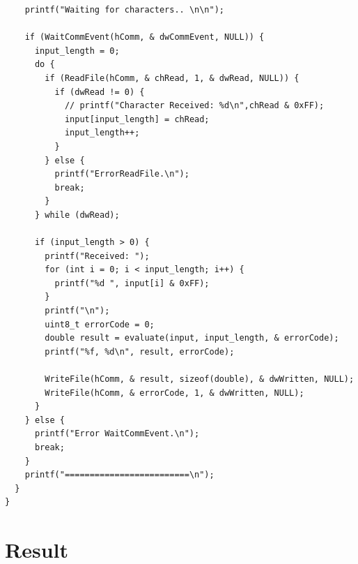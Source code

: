 \documentclass[a4paper, twoside]{report}
\begin{document}
\begin{verbatim}
    printf("Waiting for characters.. \n\n");

    if (WaitCommEvent(hComm, & dwCommEvent, NULL)) {
      input_length = 0;
      do {
        if (ReadFile(hComm, & chRead, 1, & dwRead, NULL)) {
          if (dwRead != 0) {
            // printf("Character Received: %d\n",chRead & 0xFF);
            input[input_length] = chRead;
            input_length++;
          }
        } else {
          printf("ErrorReadFile.\n");
          break;
        }
      } while (dwRead);

      if (input_length > 0) {
        printf("Received: ");
        for (int i = 0; i < input_length; i++) {
          printf("%d ", input[i] & 0xFF);
        }
        printf("\n");
        uint8_t errorCode = 0;
        double result = evaluate(input, input_length, & errorCode);
        printf("%f, %d\n", result, errorCode);

        WriteFile(hComm, & result, sizeof(double), & dwWritten, NULL);
        WriteFile(hComm, & errorCode, 1, & dwWritten, NULL);
      }
    } else {
      printf("Error WaitCommEvent.\n");
      break;
    }
    printf("=========================\n");
  }
}
\end{verbatim}


\chapter{Result}
\end{document}
